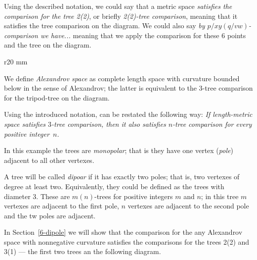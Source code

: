 Using the described notation, we could say that a metric space \emph{satisfies the comparison for the tree 2(2)}, or briefly  \emph{2(2)-tree comparison},  meaning that it satisfies the tree comparison on the diagram.
We could also say \emph{by $p/xy(q/vw)$-comparison we have...} meaning that we apply the comparison for these 6 points and the tree on the diagram.

\hide
\begin{wrapfigure}{r}{20 mm}
\end{wrapfigure}
\unhide

We define \emph{Alexandrov space} as complete length space with curvature bounded below in the sense of Alexandrov;
the latter is equivalent to the 3-tree comparison for the tripod-tree on the diagram. 

Using the introduced notation, \cite[4.1]{AKP} can be restated the following way: \emph{If length-metric space satisfies $3$-tree comparison, then it also satisfies $n$-tree comparison for every positive integer~$n$.}

In this example the trees are \emph{monopolar};
that is they have one vertex (\emph{pole}) adjacent to all other vertexes.

A tree will be called \emph{dipoar} if it has exactly two poles;
that is, two vertexes of degree at least two.
Equivalently, they could be defined as the trees with diameter 3.
These are $m(n)$-trees for positive integers $m$ and $n$; in this tree 
$m$ vertexes are adjacent to the first pole, $n$ vertexes are adjacent to the second pole and the tw poles are adjacent.

In Section~\ref{6-dipole} we will show that the comparison for the any Alexandrov space with nonnegative curvature satisfies the comparisons for the trees 2(2) and 3(1) --- the first two trees an the following diagram.

